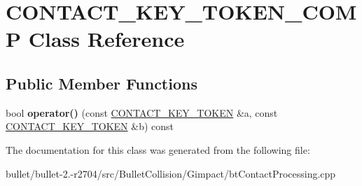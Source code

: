 \hypertarget{class_c_o_n_t_a_c_t___k_e_y___t_o_k_e_n___c_o_m_p}{\section{C\+O\+N\+T\+A\+C\+T\+\_\+\+K\+E\+Y\+\_\+\+T\+O\+K\+E\+N\+\_\+\+C\+O\+M\+P Class Reference}
\label{class_c_o_n_t_a_c_t___k_e_y___t_o_k_e_n___c_o_m_p}
}
\subsection*{Public Member Functions}
\begin{DoxyCompactItemize}
\item 
\hypertarget{class_c_o_n_t_a_c_t___k_e_y___t_o_k_e_n___c_o_m_p_a6822b2c85bd7a9f70fe376b3d8ee4f0b}{bool {\bfseries operator()} (const \hyperlink{struct_c_o_n_t_a_c_t___k_e_y___t_o_k_e_n}{C\+O\+N\+T\+A\+C\+T\+\_\+\+K\+E\+Y\+\_\+\+T\+O\+K\+E\+N} \&a, const \hyperlink{struct_c_o_n_t_a_c_t___k_e_y___t_o_k_e_n}{C\+O\+N\+T\+A\+C\+T\+\_\+\+K\+E\+Y\+\_\+\+T\+O\+K\+E\+N} \&b) const }\label{class_c_o_n_t_a_c_t___k_e_y___t_o_k_e_n___c_o_m_p_a6822b2c85bd7a9f70fe376b3d8ee4f0b}

\end{DoxyCompactItemize}


The documentation for this class was generated from the following file\+:\begin{DoxyCompactItemize}
\item 
bullet/bullet-\/2.-\/r2704/src/\+Bullet\+Collision/\+Gimpact/bt\+Contact\+Processing.\+cpp\end{DoxyCompactItemize}
